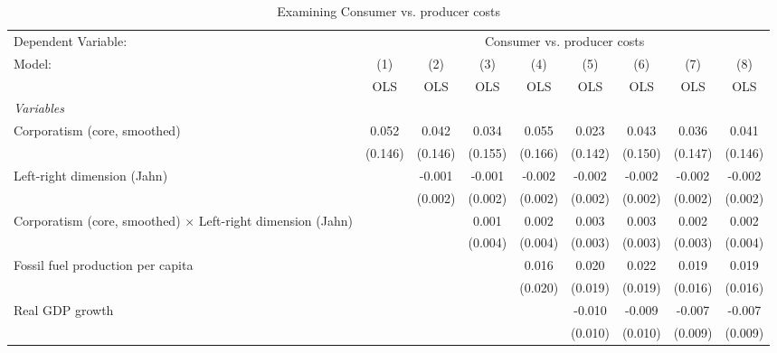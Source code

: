 
\begin{table}[htbp]
   \caption{Examining Consumer vs. producer costs}
   \centering
   \begin{tabular}{lcccccccc}
      \toprule
      Dependent Variable: & \multicolumn{8}{c}{Consumer vs. producer costs}\\
      Model:                                                             & (1)     & (2)     & (3)     & (4)     & (5)     & (6)     & (7)     & (8)\\  
                                                                         &  OLS    & OLS     & OLS     & OLS     & OLS     & OLS     & OLS     & OLS\\  
      \midrule
      \emph{Variables}\\
      Corporatism (core, smoothed)                                       & 0.052   & 0.042   & 0.034   & 0.055   & 0.023   & 0.043   & 0.036   & 0.041\\   
                                                                         & (0.146) & (0.146) & (0.155) & (0.166) & (0.142) & (0.150) & (0.147) & (0.146)\\   
      Left-right dimension (Jahn)                                        &         & -0.001  & -0.001  & -0.002  & -0.002  & -0.002  & -0.002  & -0.002\\   
                                                                         &         & (0.002) & (0.002) & (0.002) & (0.002) & (0.002) & (0.002) & (0.002)\\   
      Corporatism (core, smoothed) $\times$ Left-right dimension (Jahn)  &         &         & 0.001   & 0.002   & 0.003   & 0.003   & 0.002   & 0.002\\   
                                                                         &         &         & (0.004) & (0.004) & (0.003) & (0.003) & (0.003) & (0.004)\\   
      Fossil fuel production per capita                                  &         &         &         & 0.016   & 0.020   & 0.022   & 0.019   & 0.019\\   
                                                                         &         &         &         & (0.020) & (0.019) & (0.019) & (0.016) & (0.016)\\   
      Real GDP growth                                                    &         &         &         &         & -0.010  & -0.009  & -0.007  & -0.007\\   
                                                                         &         &         &         &         & (0.010) & (0.010) & (0.009) & (0.009)\\   

\end{tabular}
\end{table}
